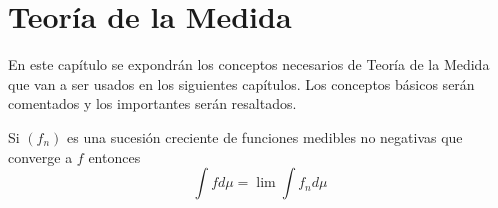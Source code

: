 \chapter{Teoría de la Medida}

En este capítulo se expondrán los conceptos necesarios de Teoría de la Medida que van a ser usados en los siguientes capítulos. Los conceptos básicos serán comentados y los importantes serán resaltados.

\begin{teorema}\label{convergencia_monotona}
	Si $(f_n)$ es una sucesión creciente de funciones medibles no negativas que converge a $f$ entonces
	\begin{equation}
		\int f d\mu = \lim \int f_n d\mu
	\end{equation}
\end{teorema}

